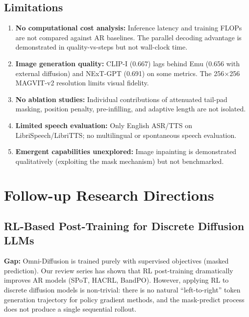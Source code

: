 \documentclass[11pt]{article}
\begin{document}
\subsection{Limitations}

\begin{enumerate}
    \item \textbf{No computational cost analysis:} Inference latency and training FLOPs are not compared against AR baselines. The parallel decoding advantage is demonstrated in quality-vs-steps but not wall-clock time.
    \item \textbf{Image generation quality:} CLIP-I (0.667) lags behind Emu (0.656 with external diffusion) and NExT-GPT (0.691) on some metrics. The 256$\times$256 MAGVIT-v2 resolution limits visual fidelity.
    \item \textbf{No ablation studies:} Individual contributions of attenuated tail-pad masking, position penalty, pre-infilling, and adaptive length are not isolated.
    \item \textbf{Limited speech evaluation:} Only English ASR/TTS on LibriSpeech/LibriTTS; no multilingual or spontaneous speech evaluation.
    \item \textbf{Emergent capabilities unexplored:} Image inpainting is demonstrated qualitatively (exploiting the mask mechanism) but not benchmarked.
\end{enumerate}

\section{Follow-up Research Directions}

\subsection{RL-Based Post-Training for Discrete Diffusion LLMs}

\textbf{Gap:} Omni-Diffusion is trained purely with supervised objectives (masked prediction). Our review series has shown that RL post-training dramatically improves AR models (SPoT, HACRL, BandPO). However, applying RL to discrete diffusion models is non-trivial: there is no natural ``left-to-right'' token generation trajectory for policy gradient methods, and the mask-predict process does not produce a single sequential rollout.
\end{document}
